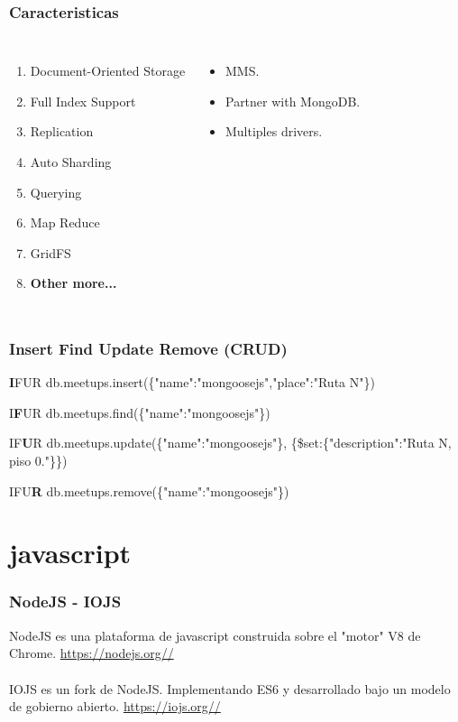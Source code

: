 \documentclass{beamer}
\begin{document}
\begin{frame}
\frametitle{Caracteristicas}
\begin{columns}[c]

\begin{enumerate}
\pause
\item Document-Oriented Storage
\pause
\item Full Index Support
\pause
\item Replication
\pause
\item Auto Sharding
\pause
\item Querying
\pause
\item Map Reduce
\pause
\item GridFS
\pause
\item \textbf{Other more...}
\end{enumerate}
\begin{itemize}
\item MMS.
\item Partner with MongoDB.
\item Multiples drivers.
\end{itemize}
\end{columns}
\end{frame}

\begin{frame}
\frametitle{Insert Find Update Remove (CRUD)}
\begin{block}{\textbf{I}FUR}
db.meetups.insert(\{"name":"mongoosejs","place":"Ruta N"\})
\end{block}
\begin{block}{I\textbf{F}UR}
db.meetups.find(\{"name":"mongoosejs"\})
\end{block}
\begin{block}{IF\textbf{U}R}
db.meetups.update(\{"name":"mongoosejs"\},
\{\$set:\{"description":"Ruta N, piso 0."\}\})
\end{block}
\begin{block}{IFU\textbf{R}}
db.meetups.remove(\{"name":"mongoosejs"\})
\end{block}
\end{frame}

\section{javascript}
\begin{frame}
\frametitle{NodeJS - IOJS}
NodeJS es una plataforma de javascript construida sobre el "motor" V8 de Chrome.
{\color{blue}\url{https://nodejs.org//}}
\pause
\\~\\
IOJS es un fork de NodeJS. Implementando ES6 y desarrollado bajo un modelo de gobierno abierto.
{\color{blue}\url{https://iojs.org//}}
\end{frame}
\end{document}
